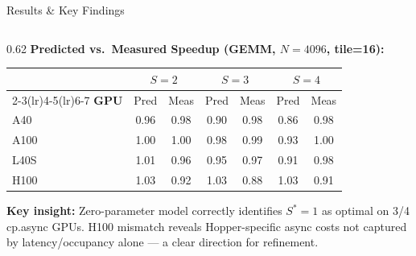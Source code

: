 \documentclass[aspectratio=169,10pt]{beamer}
\begin{document}
\begin{frame}{Results \& Key Findings}
\begin{columns}[T]
\begin{column}{0.62\textwidth}
\vspace{0.2em}
\textbf{Predicted vs.\ Measured Speedup (GEMM, $N{=}4096$, tile=16):}

\vspace{0.1em}
\renewcommand{\arraystretch}{1.1}
\begin{table}
\centering
\scriptsize
\begin{tabular}{@{}l cc cc cc@{}}
\toprule
 & \multicolumn{2}{c}{\textbf{$S{=}2$}} & \multicolumn{2}{c}{\textbf{$S{=}3$}} & \multicolumn{2}{c}{\textbf{$S{=}4$}} \\
\cmidrule(lr){2-3}\cmidrule(lr){4-5}\cmidrule(lr){6-7}
\textbf{GPU} & Pred & Meas & Pred & Meas & Pred & Meas \\
\midrule
\textcolor{gpuA40}{A40}      & 0.96 & 0.98 & 0.90 & 0.98 & 0.86 & 0.98 \\
\textcolor{gpuA100}{A100}    & 1.00 & 1.00 & 0.98 & 0.99 & 0.93 & 1.00 \\
\textcolor{gpuL40S}{L40S}    & 1.01 & 0.96 & 0.95 & 0.97 & 0.91 & 0.98 \\
\textcolor{gpuH100}{H100}    & 1.03 & 0.92 & 1.03 & 0.88 & 1.03 & 0.91 \\
\bottomrule
\end{tabular}
\end{table}

\vspace{0.1em}
\centering\scriptsize
\textbf{Key insight:} Zero-parameter model correctly identifies $S^*{=}1$ as optimal on 3/4 cp.async GPUs. H100 mismatch reveals Hopper-specific async costs not captured by latency/occupancy alone --- a clear direction for refinement.
\end{column}
\end{columns}
\end{frame}
\end{document}
